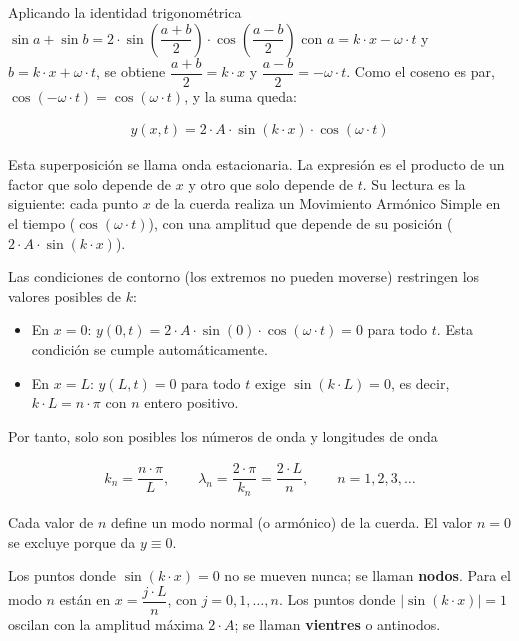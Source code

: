 \documentclass[
  spanish,
]{article}
\providecommand{\tightlist}{%
  \setlength{\itemsep}{0pt}\setlength{\parskip}{0pt}}
\begin{document}
Aplicando la identidad trigonométrica
\(\sin a + \sin b = 2 \cdot \sin\left(\dfrac{a+b}{2}\right) \cdot \cos\left(\dfrac{a-b}{2}\right)\)
con \(a = k \cdot x - \omega \cdot t\) y
\(b = k \cdot x + \omega \cdot t\), se obtiene
\(\dfrac{a+b}{2} = k \cdot x\) y \(\dfrac{a-b}{2} = -\omega \cdot t\).
Como el coseno es par, \(\cos(-\omega \cdot t) = \cos(\omega \cdot t)\),
y la suma queda:

\[
\begin{aligned}
y(x,t) = 2 \cdot A \cdot \sin(k \cdot x) \cdot \cos(\omega \cdot t)
\end{aligned}
\]

Esta superposición se llama onda estacionaria. La expresión es el
producto de un factor que solo depende de \(x\) y otro que solo depende
de \(t\). Su lectura es la siguiente: cada punto \(x\) de la cuerda
realiza un Movimiento Armónico Simple en el tiempo
(\(\cos(\omega \cdot t)\)), con una amplitud que depende de su posición
(\(2 \cdot A \cdot \sin(k \cdot x)\)).

Las condiciones de contorno (los extremos no pueden moverse) restringen
los valores posibles de \(k\):

\begin{itemize}
\tightlist
\item
  En \(x = 0\):
  \(y(0,t) = 2 \cdot A \cdot \sin(0) \cdot \cos(\omega \cdot t) = 0\)
  para todo \(t\). Esta condición se cumple automáticamente.
\item
  En \(x = L\): \(y(L,t) = 0\) para todo \(t\) exige
  \(\sin(k \cdot L) = 0\), es decir, \(k \cdot L = n \cdot \pi\) con
  \(n\) entero positivo.
\end{itemize}

Por tanto, solo son posibles los números de onda y longitudes de onda

\[
\begin{aligned}
k_n = \dfrac{n \cdot \pi}{L}, \qquad \lambda_n = \dfrac{2 \cdot \pi}{k_n} = \dfrac{2 \cdot L}{n}, \qquad n = 1, 2, 3, \dots
\end{aligned}
\]

Cada valor de \(n\) define un modo normal (o armónico) de la cuerda. El
valor \(n=0\) se excluye porque da \(y \equiv 0\).

Los puntos donde \(\sin(k \cdot x) = 0\) no se mueven nunca; se llaman
\textbf{nodos}. Para el modo \(n\) están en
\(x = \dfrac{j \cdot L}{n}\), con \(j = 0, 1, \dots, n\). Los puntos
donde \(|\sin(k \cdot x)| = 1\) oscilan con la amplitud máxima
\(2 \cdot A\); se llaman \textbf{vientres} o antinodos.
\end{document}
